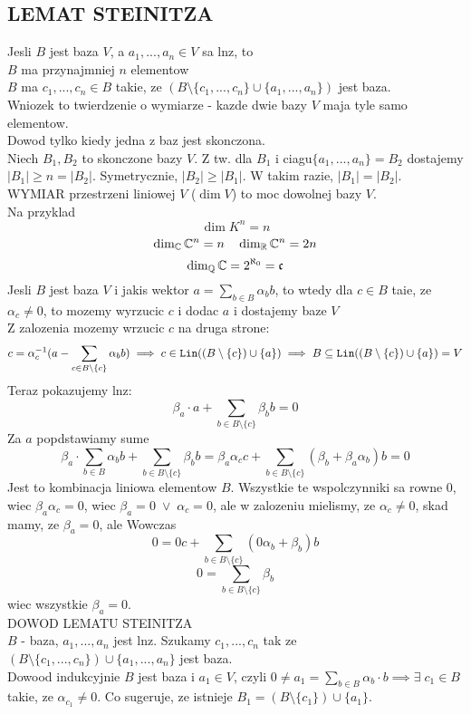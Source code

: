 \documentclass{article}
\begin{document}
\subsection*{LEMAT STEINITZA}
Jesli $B$ jest baza $V$, a $a_1, ..., a_n\in V$ sa lnz, to\\
$B$ ma przynajmniej $n$ elementow\\
$B$ ma $c_1, ..., c_n\in B$ takie, ze $(B\setminus\{c_1, ..., c_n\}\cup\{a_1, ..., a_n\})$ jest baza.\medskip\\
Wniozek to twierdzenie o wymiarze - kazde dwie bazy $V$ maja tyle samo elementow.\\
Dowod tylko kiedy jedna z baz jest skonczona.\\
Niech $B_1, B_2$ to skonczone bazy $V$. Z tw. dla $B_1$ i ciagu$\{a_1, ..., a_n\}=B_2$ dostajemy $|B_1|\geq n=|B_2|$. Symetrycznie, $|B_2|\geq |B_1|$. W takim razie, $|B_1|=|B_2|$. \\
WYMIAR przestrzeni liniowej $V$ ($\dim V$) to moc dowolnej bazy $V$. \\
Na przyklad
$$\dim K^n=n$$
$$\dim_{\mathbb{C}}\mathbb{C}^n=n\quad \dim_{\mathbb{R}}\mathbb{C}^n=2n$$
$$\dim_{\mathbb{Q}}\mathbb{C}=2^{\aleph_0}=\mathfrak{c}$$
Jesli $B$ jest baza $V$ i jakis wektor $a=\sum\limits_{b\in B}\alpha_b b$, to wtedy dla $c\in B$ taie, ze $\alpha_c\neq 0$, to mozemy wyrzucic $c$ i dodac $a$ i dostajemy baze $V$\\
Z zalozenia mozemy wrzucic $c$ na druga strone:
$$c=\alpha_c^{-1}(a-\sum\limits_{c\in B\setminus\{c\}}\alpha_bb) \implies c\in \texttt{Lin}((B\setminus\{c\})\cup\{a\})\implies B\subseteq\texttt{Lin}((B\setminus\{c\})\cup\{a\})=V$$
Teraz pokazujemy lnz:
$$\beta_a\cdot a+\sum\limits_{b\in B\setminus\{c\}}
\beta_bb=0$$
Za $a$ popdstawiamy sume
$$\beta_a\cdot \sum\limits_{b\in B}\alpha_b b+\sum\limits_{b\in B\setminus\{c\}}\beta_bb=\beta_a\alpha_cc+\sum\limits_{b\in B\setminus\{c\}}(\beta_b+\beta_a\alpha_b)b=0$$
Jest to kombinacja liniowa elementow $B$. Wszystkie te wspolczynniki sa rowne 0, wiec $\beta_a\alpha_c=0$, wiec $\beta_a=0\;\lor\;\alpha_c=0$, ale w zalozeniu mielismy, ze $\alpha_c\neq 0$, skad mamy, ze $\beta_a=0$, ale Wowczas
$$0=0c+\sum\limits_{b\in B\setminus\{c\}}(0\alpha_b+\beta_b)b$$
$$0=\sum\limits_{b\in B\setminus\{c\}}\beta_b$$
wiec wszystkie $\beta_a=0$.\\
DOWOD LEMATU STEINITZA\\
$B$ - baza, $a_1, ..., a_n$ jest lnz. Szukamy $c_1, ..., c_n$ tak ze $(B\setminus\{c_1, ..., c_n\})\cup\{a_1, ..., a_n\}$ jest baza.\\
Dowood indukcyjnie
$B$ jest baza i $a_1\in V$, czyli $0\neq a_1=\sum\limits_{b\in B}\alpha_b\cdot b\implies \exists\;c_1\in B$ takie, ze $\alpha_{c_1}\neq0$. Co sugeruje, ze istnieje $B_1 = (B\setminus\{c_1\})\cup\{a_1\}$.\\
\end{document}
